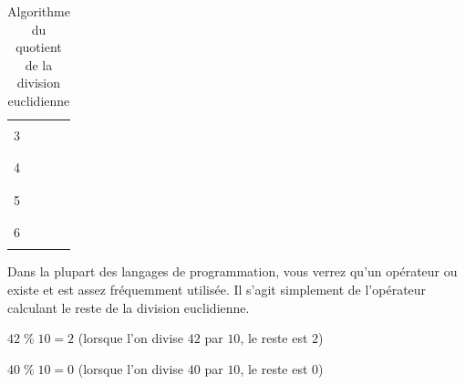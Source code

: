 \documentclass[11pt,a4paper]{article}
\begin{document}
\begin{table}[h!]
\begin{minipage}{0.4\textwidth}
\begin{tabular}{|C{1cm}|C{1cm}|C{1cm}|}
        \hline
             &    &       \\
        3    &    &       \\
             &    &       \\
        \hline
             &    &       \\
        4    &    &       \\
             &    &       \\
        \hline
             &    &       \\
        5    &    &       \\
             &    &       \\
        \hline
             &    &       \\
        6    &    &       \\
             &    &       \\
        \hline
    \end{tabular}
  \end{minipage}
  \caption{Algorithme du quotient de la division euclidienne}
  \label{division-euclidienne-quotient}
\end{table}

\bigskip


\bigskip



\bigskip


\bigskip

Dans la plupart des langages de programmation, vous verrez qu'un opérateur  ou \TTBF{\%} existe et est assez fréquemment utilisée.
Il s'agit simplement de l'opérateur calculant le reste de la division euclidienne.

$ 42 \; \% \; 10 = 2 $ (lorsque l'on divise $ 42 $ par $ 10 $, le reste est $ 2 $)

$ 40 \; \% \; 10 = 0 $ (lorsque l'on divise $ 40 $ par $ 10 $, le reste est $ 0 $)
\end{document}
